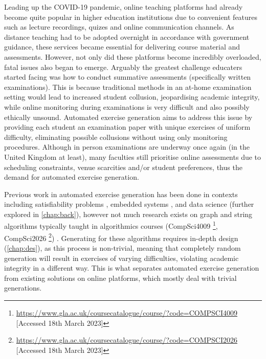\documentclass{l4proj}
\begin{document}
Leading up the COVID-19 pandemic, online teaching platforms had already become quite popular in higher education institutions due to convenient features such as lecture recordings, quizes and online communication channels. As distance teaching had to be adopted overnight in accordance with government guidance, these services became essential for delivering course material and assessments. However, not only did these platforms become incredibly overloaded, fatal issues also began to emerge. Arguably the greatest challenge educaters started facing was how to conduct summative assessments (specifically written examinations). This is because traditional methods in an at-home examination setting would lead to increased student collusion, jeopardising academic integrity, while online monitoring during examinations is very difficult and also possibly ethically unsound. Automated exercise generation aims to address this issue by providing each student an examination paper with unique exercises of uniform difficulty, eliminating possible collusions without using only monitoring procedures. Although in person examinations are underway once again (in the United Kingdom at least), many faculties still prioritise online assessments due to scheduling constraints, venue scarcities and/or student preferences, thus the demand for automated exercise generation.

Previous work in automated exercise generation has been done in contexts including satisfiability problems \cite{Hoz21}, embedded systems  \cite{Sad12}, and data science \cite{Kot19} (further explored in \autoref{chap:back}), however not much research exists on graph and string algorithms typically taught in algorithmics courses (CompSci4009  \footnote{\url{https://www.gla.ac.uk/coursecatalogue/course/?code=COMPSCI4009} [Accessed 18th March 2023]}, CompSci2026 \footnote{\url{https://www.gla.ac.uk/coursecatalogue/course/?code=COMPSCI2026} [Accessed 18th March 2023]}) . Generating for these algorithms requires in-depth design (\autoref{chap:des}), as this process is non-trivial, meaning that completely random generation will result in exercises of varying difficulties, violating academic integrity in a different way. This is what separates automated exercise generation from existing solutions on online platforms, which mostly deal with trivial generations.
\end{document}
